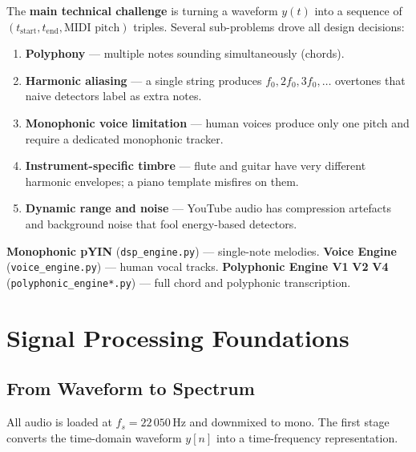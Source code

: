 \documentclass[12pt, a4paper]{article}
\begin{document}
The \textbf{main technical challenge} is turning a waveform $y(t)$ into a
sequence of $(t_{\text{start}}, t_{\text{end}}, \text{MIDI pitch})$ triples.
Several sub-problems drove all design decisions:

\begin{enumerate}[leftmargin=2em]
  \item \textbf{Polyphony} --- multiple notes sounding simultaneously (chords).
  \item \textbf{Harmonic aliasing} --- a single string produces
        $f_0, 2f_0, 3f_0,\ldots$ overtones that naive detectors label as extra notes.
  \item \textbf{Monophonic voice limitation} --- human voices produce only
        one pitch and require a dedicated monophonic tracker.
  \item \textbf{Instrument-specific timbre} --- flute and guitar have very
        different harmonic envelopes; a piano template misfires on them.
  \item \textbf{Dynamic range and noise} --- YouTube audio has compression
        artefacts and background noise that fool energy-based detectors.
\end{enumerate}

\begin{notebox}
  \textbf{Monophonic pYIN} (\texttt{dsp\_engine.py}) --- single-note melodies.\newline
  \textbf{Voice Engine} (\texttt{voice\_engine.py}) --- human vocal tracks.\newline
  \textbf{Polyphonic Engine V1\,{\textrightarrow}\,V2\,{\textrightarrow}\,V4}
  (\texttt{polyphonic\_engine*.py}) --- full chord and polyphonic transcription.
\end{notebox}

\section{Signal Processing Foundations}

\subsection{From Waveform to Spectrum}

All audio is loaded at $f_s = 22\,050\,\text{Hz}$ and downmixed to mono.
The first stage converts the time-domain waveform $y[n]$ into a
time-frequency representation.
\end{document}
